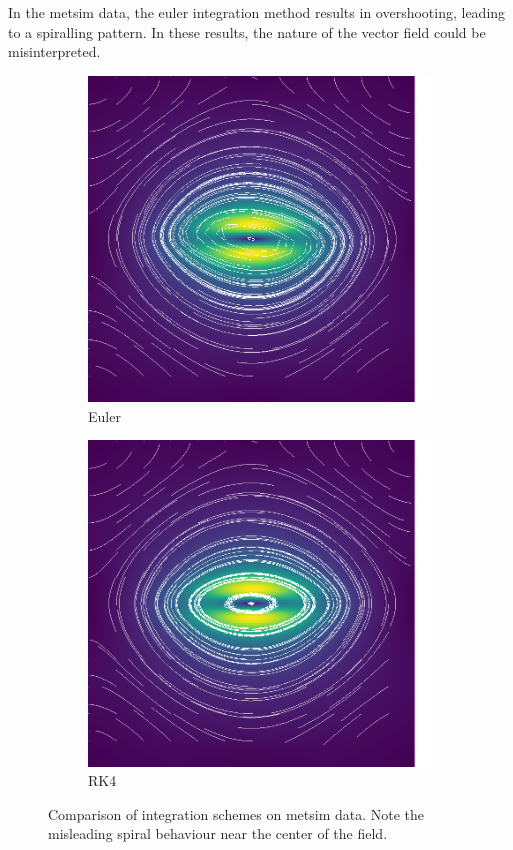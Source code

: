 \documentclass{article}
\begin{document}
In the metsim data, the euler integration method results in overshooting, leading to a spiralling pattern. In these results,
the nature of the vector field could be misinterpreted.

\begin{figure}[h!]
    \centering
    \begin{subfigure}{0.48\textwidth}
        \centering
        \includegraphics[width=\textwidth, angle=0]{metsim_uniform_euler.eps}
        \caption{Euler}
    \end{subfigure}
    \hfill
    \begin{subfigure}{0.48\textwidth}
        \centering
        \includegraphics[width=\textwidth, angle=0]{metsim_uniform_rk4.eps}
        \caption{RK4}
    \end{subfigure}
    \caption{Comparison of integration schemes on metsim data. Note the misleading spiral behaviour near the center of the field.}
\end{figure}
\end{document}

